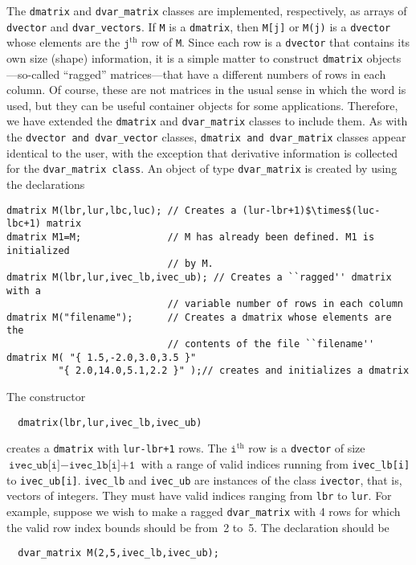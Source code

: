 \documentclass{admbmanual}
\begin{document}
The \texttt{dmatrix} and \texttt{dvar\_matrix} classes are implemented,
respectively, as arrays of \texttt{dvector} and \texttt{dvar\_vectors}. If
\texttt{M} is a \texttt{dmatrix}, then \texttt{M[j]} or \texttt{M(j)} is a
\texttt{dvector} whose elements are the $\texttt{j}^\textrm{th}$ row of
\texttt{M}. Since each row is a \texttt{dvector} that contains its own size
(shape) information, it is a simple matter to construct \texttt{dmatrix}
objects---so-called ``ragged'' matrices---that have a different numbers of rows
in each column. Of course, these are not matrices in the usual sense in which
the word is used, but they can be useful container objects for some
applications. Therefore, we have extended the \texttt{dmatrix} and
\texttt{dvar\_matrix} classes to include them. As with the \texttt{dvector and
  dvar\_vector} classes, \texttt{dmatrix and dvar\_matrix} classes appear
identical to the user, with the exception that derivative information is
collected for the \texttt{dvar\_matrix class}. An object of type
\texttt{dvar\_matrix} is created by using the declarations
\begin{lstlisting}
dmatrix M(lbr,lur,lbc,luc); // Creates a (lur-lbr+1)$\times$(luc-lbc+1) matrix
dmatrix M1=M;               // M has already been defined. M1 is initialized
                            // by M.
dmatrix M(lbr,lur,ivec_lb,ivec_ub); // Creates a ``ragged'' dmatrix with a
                            // variable number of rows in each column
dmatrix M("filename");      // Creates a dmatrix whose elements are the
                            // contents of the file ``filename''
dmatrix M( "{ 1.5,-2.0,3.0,3.5 }"
         "{ 2.0,14.0,5.1,2.2 }" );// creates and initializes a dmatrix
\end{lstlisting}

The constructor
\begin{lstlisting}
  dmatrix(lbr,lur,ivec_lb,ivec_ub)
\end{lstlisting}
creates a \texttt{dmatrix} with \texttt{lur-lbr+1} rows. The
$\texttt{i}^\textrm{th}$ row is a \texttt{dvector} of size $\texttt{ivec\_ub[i]}
- \texttt{ivec\_lb[i]+1}$ with a range of valid indices running from
\texttt{ivec\_lb[i]} to \texttt{ivec\_ub[i]}. \texttt{ivec\_lb} and
\texttt{ivec\_ub} are instances of the class \texttt{ivector}, that is, vectors
of integers. They must have valid indices ranging from \texttt{lbr} to
\texttt{lur}. For example, suppose we wish to make a ragged
\texttt{dvar\_matrix} with 4 rows for which the valid row index bounds should be
from~2 to~5. The declaration should be
\begin{lstlisting}
  dvar_matrix M(2,5,ivec_lb,ivec_ub);
\end{lstlisting}
\end{document}
